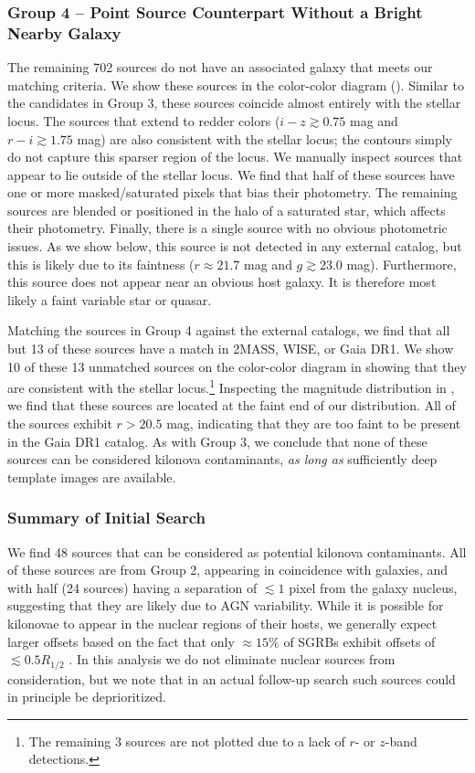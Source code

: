 \subsubsection{Group 4 -- Point Source Counterpart Without a Bright Nearby Galaxy}
\label{sec:ch3_group4}

The remaining 702 sources do not have an associated galaxy that meets our matching criteria. We show these sources in the color-color diagram (). Similar to the candidates in Group 3, these sources coincide almost entirely with the stellar locus. The sources that extend to redder colors ($i-z \gtrsim 0.75$ mag and $r-i \gtrsim 1.75$ mag) are also consistent with the stellar locus; the contours simply do not capture this sparser region of the locus. We manually inspect sources that appear to lie outside of the stellar locus. We find that half of these sources have one or more masked/saturated pixels that bias their photometry. The remaining sources are blended or positioned in the halo of a saturated star, which affects their photometry. Finally, there is a single source with no obvious photometric issues. As we show below, this source is not detected in any external catalog, but this is likely due to its faintness ($r \approx 21.7$ mag and $g \gtrsim 23.0$ mag). Furthermore, this source does not appear near an obvious host galaxy. It is therefore most likely a faint variable star or quasar.

Matching the sources in Group 4 against the external catalogs, we find that all but 13 of these sources have a match in 2MASS, WISE, or Gaia DR1. We show 10 of these 13 unmatched sources on the color-color diagram in  showing that they are consistent with the stellar locus.\footnote{\singlespace The remaining 3 sources are not plotted due to a lack of $r$- or $z$-band detections.} Inspecting the magnitude distribution in , we find that these sources are located at the faint end of our distribution. All of the sources exhibit $r > 20.5$ mag, indicating that they are too faint to be present in the Gaia DR1 catalog. As with Group 3, we conclude that none of these sources can be considered kilonova contaminants, {\it as long as} sufficiently deep template images are available.

\subsubsection{Summary of Initial Search}
\label{sec:ch3_search_summary}
We find 48 sources that can be considered as potential kilonova contaminants. All of these sources are from Group 2, appearing in coincidence with galaxies, and with half (24 sources) having a separation of $\lesssim 1$ pixel from the galaxy nucleus, suggesting that they are likely due to AGN variability. While it is possible for kilonovae to appear in the nuclear regions of their hosts, we generally expect larger offsets based on the fact that only $\approx 15\%$ of SGRBs exhibit offsets of $\lesssim 0.5 R_{1/2}$ \citep{FongBerger13,Fong+13,Berger2014}. In this analysis we do not eliminate nuclear sources from consideration, but we note that in an actual follow-up search such sources could in principle be deprioritized.

